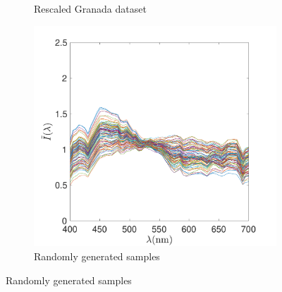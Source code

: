 \documentclass{jov}
\begin{document}
\begin{figure}
\begin{subfigure}[b]{0.3\textwidth}
        \caption{Rescaled Granada dataset}
        \label{fig:rescaledGranada}
    \end{subfigure}
    \begin{subfigure}[b]{0.3 \textwidth}
    \centering
        \includegraphics[width=\textwidth]{../Figures/Figure6/Figure6_c.pdf}
        \caption{Randomly generated samples}
        \label{fig:randomIlluminant}
    \end{subfigure}


\end{figure}
\end{document}

